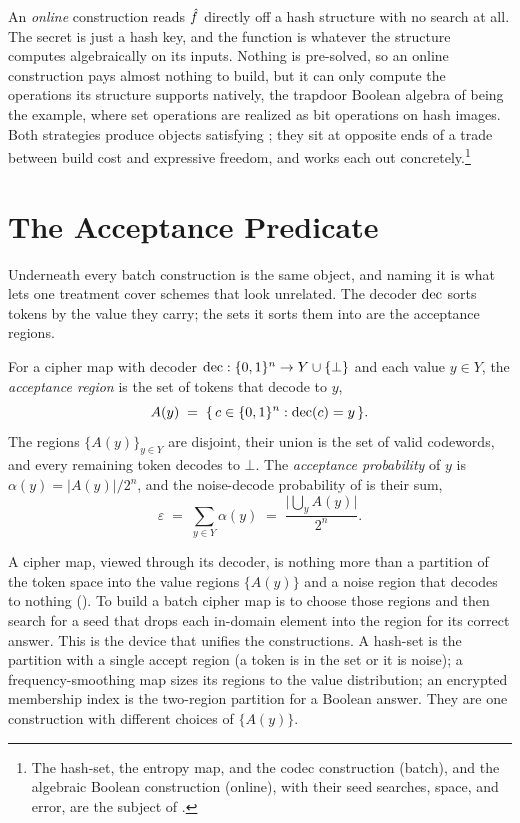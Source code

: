 An \emph{online} construction reads $\hat{f}$ directly off a hash structure
with no search at all. The secret is just a hash key, and the function is
whatever the structure computes algebraically on its inputs. Nothing is
pre-solved, so an online construction pays almost nothing to build, but it
can only compute the operations its structure supports natively, the
trapdoor Boolean algebra of  being the example, where
set operations are realized as bit operations on hash images. Both
strategies produce objects satisfying ; they sit at
opposite ends of a trade between build cost and expressive freedom, and
 works each out concretely.\footnote{The hash-set,
the entropy map, and the codec construction (batch), and the algebraic
Boolean construction (online), with their seed searches, space, and error,
are the subject of .}

\section{The Acceptance Predicate}
\label{sec:acceptance}

Underneath every batch construction is the same object, and naming it is
what lets one treatment cover schemes that look unrelated. The decoder
$\operatorname{dec}$ sorts tokens by the value they carry; the sets it sorts them into are
the acceptance regions.

\begin{definition}
\label{def:acceptance}
For a cipher map with decoder $\operatorname{dec} : \{0,1\}^n \to Y \cup \{\bot\}$ and each
value $y \in Y$, the \emph{acceptance region} is the set of tokens that
decode to $y$,
\[
  A(y) \;=\; \{\, c \in \{0,1\}^n : \operatorname{dec}(c) = y \,\}.
\]
The regions $\{A(y)\}_{y \in Y}$ are disjoint, their union is the set of
valid codewords, and every remaining token decodes to $\bot$. The
\emph{acceptance probability} of $y$ is $\alpha(y) = \lvert A(y)\rvert / 2^n$,
and the noise-decode probability of  is their sum,
\[
  \varepsilon \;=\; \sum_{y \in Y} \alpha(y)
  \;=\; \frac{\lvert \bigcup_y A(y)\rvert}{2^n}.
\]
\end{definition}

A cipher map, viewed through its decoder, is nothing more than a partition
of the token space into the value regions $\{A(y)\}$ and a noise region that
decodes to nothing (). To build a batch cipher map is to
choose those regions and then search for a seed that drops each in-domain
element into the region for its correct answer. This is the device that
unifies the constructions. A hash-set is the partition with a single
accept region (a token is in the set or it is noise); a frequency-smoothing
map sizes its regions to the value distribution; an encrypted membership
index is the two-region partition for a Boolean answer. They are one
construction with different choices of $\{A(y)\}$.

